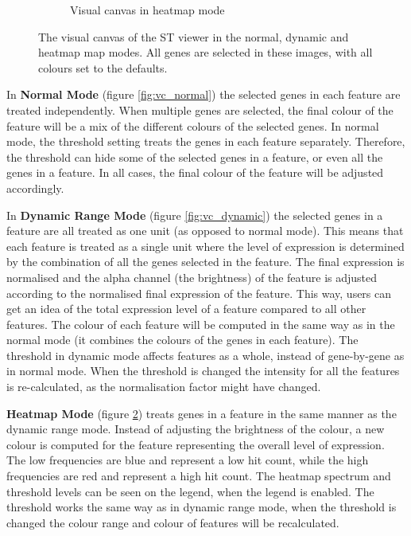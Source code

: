 \documentclass[10pt,a4paper,titlepage]{book}
\begin{document}
\begin{figure}[h]
\begin{subfigure}{0.3\linewidth}
		\caption{Visual canvas in heatmap mode}
		\label{fig:vc_heatmap}
	\end{subfigure}
	\caption[The visual canvas of the ST viewer in each map mode.]{The visual canvas of the ST viewer in the normal, dynamic and heatmap map modes. All genes are selected in these images, with all colours set to the defaults.}
\end{figure}

In \textbf{Normal Mode} (figure \ref{fig:vc_normal}) the selected genes in each feature are treated independently. When multiple genes are selected, the final colour of the feature will be a mix of the different colours of the selected genes. In normal mode, the threshold setting treats the genes in each feature separately. Therefore, the threshold can hide some of the selected genes in a feature, or even all the genes in a feature. In all cases, the final colour of the feature will be adjusted accordingly.

In \textbf{Dynamic Range Mode} (figure \ref{fig:vc_dynamic}) the selected genes in a feature are all treated as one unit (as opposed to normal mode). This means that each feature is treated as a single unit where the level of expression is determined by the combination of all the genes selected in the feature. The final expression is normalised and the alpha channel (the brightness) of the feature is adjusted according  to the normalised final expression of the feature. This way, users can get an idea of the total expression level of a feature compared to all other features. The colour of each feature will be computed in the same way as in the normal mode (it combines the colours of the genes in each feature).
The threshold in dynamic mode affects features as a whole, instead of gene-by-gene as in normal mode. When the threshold is changed the intensity for all the features is re-calculated, as the normalisation factor might have changed.

\textbf{Heatmap Mode} (figure \ref{fig:vc_heatmap}) treats genes in a feature in the same manner as the dynamic range mode. Instead of adjusting the brightness of the colour, a new colour is computed for the feature representing the overall level of expression. The low frequencies are blue and represent a low hit count, while the high frequencies are red and represent a high hit count. The heatmap spectrum and threshold levels can be seen on the legend, when the legend is enabled.
The threshold works the same way as in dynamic range mode, when the threshold is changed the colour range and colour of features will be recalculated.
\end{document}
